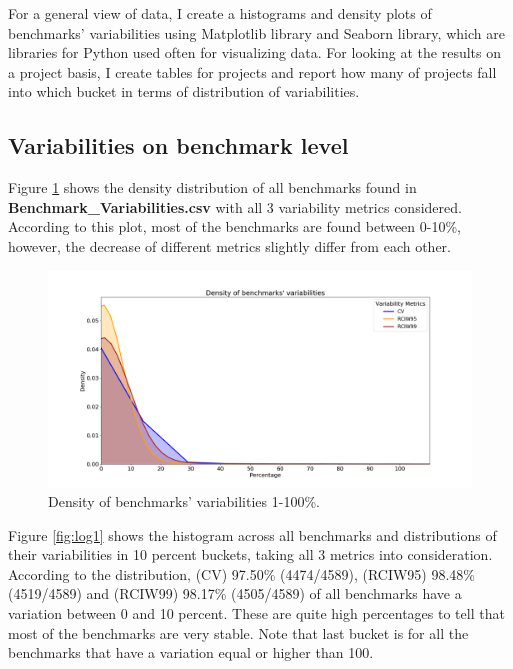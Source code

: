 \documentclass{seal_thesis}
\begin{document}
\noindent For a general view of data, I create a histograms and density plots of benchmarks' variabilities using Matplotlib library \cite{Matplotlib} and Seaborn library\cite{Seaborn}, which are libraries for Python used often for visualizing data. For looking at the results on a project basis, I create tables for projects and report how many of projects fall into which bucket in terms of distribution of variabilities.

\subsection{Variabilities on benchmark level}

Figure \ref{fig:density1} shows the density distribution of all benchmarks found in \textbf{Benchmark\_Variabilities.csv} with all 3 variability metrics considered. According to this plot, most of the benchmarks are found between 0-10\%, however, the decrease of different metrics slightly differ from each other.

\begin{figure}[H]
	\centering
	\includegraphics[width=\linewidth]{resultsvis/density_controlled1}
	\caption{Density of benchmarks' variabilities 1-100\%.}
	\label{fig:density1}
\end{figure}

\noindent Figure \ref{fig:log1} shows the histogram across all benchmarks and distributions of their variabilities in 10 percent buckets, taking all 3 metrics into consideration. According to the distribution, (CV) 97.50\% (4474/4589), (RCIW95) 98.48\% (4519/4589) and (RCIW99) 98.17\% (4505/4589) of all benchmarks have a variation between 0 and 10 percent. These are quite high percentages to tell that most of the benchmarks are very stable. Note that last bucket is for all the benchmarks that have a variation equal or higher than 100.
\end{document}
